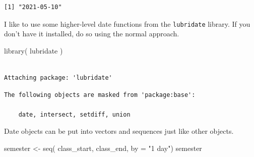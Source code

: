 \documentclass[
  letterpaper,
]{book}
\newenvironment{Shaded}{\begin{snugshade}}{\end{snugshade}}
\newcommand{\AttributeTok}[1]{\textcolor[rgb]{0.40,0.45,0.13}{#1}}
\newcommand{\FunctionTok}[1]{\textcolor[rgb]{0.28,0.35,0.67}{#1}}
\newcommand{\NormalTok}[1]{\textcolor[rgb]{0.00,0.23,0.31}{#1}}
\newcommand{\OtherTok}[1]{\textcolor[rgb]{0.00,0.23,0.31}{#1}}
\newcommand{\StringTok}[1]{\textcolor[rgb]{0.13,0.47,0.30}{#1}}
\begin{document}
\begin{verbatim}
[1] "2021-05-10"
\end{verbatim}

I like to use some higher-level date functions from the
\texttt{lubridate} library. If you don't have it installed, do so using
the normal approach.

\begin{Shaded}
\begin{Highlighting}[]
\FunctionTok{library}\NormalTok{( lubridate )}
\end{Highlighting}
\end{Shaded}

\begin{verbatim}

Attaching package: 'lubridate'
\end{verbatim}

\begin{verbatim}
The following objects are masked from 'package:base':

    date, intersect, setdiff, union
\end{verbatim}

Date objects can be put into vectors and sequences just like other
objects.

\begin{Shaded}
\begin{Highlighting}[]
\NormalTok{semester }\OtherTok{\textless{}{-}} \FunctionTok{seq}\NormalTok{( class\_start, class\_end, }\AttributeTok{by =} \StringTok{"1 day"}\NormalTok{)}
\NormalTok{semester}
\end{Highlighting}
\end{Shaded}
\end{document}
